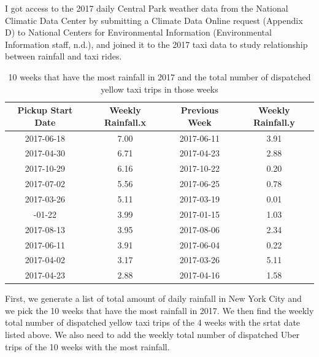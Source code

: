 \documentclass[12pt,twoside]{reedthesis}
\theoremstyle{definition}
\theoremstyle{definition}
\theoremstyle{definition}
\theoremstyle{remark}
\begin{document}
I got access to the 2017 daily Central Park weather data from the
National Climatic Data Center by submitting a Climate Data Online
request (Appendix D) to National Centers for Environmental Information
(Environmental Information staff, n.d.), and joined it to the 2017 taxi
data to study relationship between rainfall and taxi rides.
\begin{table}

\caption{\label{tab:unnamed-chunk-75}10 weeks that have the most rainfall in 2017 and the total number of dispatched yellow taxi trips in those weeks}
\centering
\begin{tabular}[t]{cccc}
\toprule
Pickup Start Date & Weekly Rainfall.x & Previous Week & Weekly Rainfall.y\\
\midrule
2017-06-18 & 7.00 & 2017-06-11 & 3.91\\
2017-04-30 & 6.71 & 2017-04-23 & 2.88\\
2017-10-29 & 6.16 & 2017-10-22 & 0.20\\
2017-07-02 & 5.56 & 2017-06-25 & 0.78\\
2017-03-26 & 5.11 & 2017-03-19 & 0.01\\
\addlinespace
2017-01-22 & 3.99 & 2017-01-15 & 1.03\\
2017-08-13 & 3.95 & 2017-08-06 & 2.34\\
2017-06-11 & 3.91 & 2017-06-04 & 0.22\\
2017-04-02 & 3.17 & 2017-03-26 & 5.11\\
2017-04-23 & 2.88 & 2017-04-16 & 1.58\\
\bottomrule
\end{tabular}
\end{table}
First, we generate a list of total amount of daily rainfall in New York
City and we pick the 10 weeks that have the most rainfall in 2017. We
then find the weekly total number of dispatched yellow taxi trips of the
4 weeks with the srtat date listed above. We also need to add the weekly
total number of dispatched Uber trips of the 10 weeks with the most
rainfall.
\end{document}
